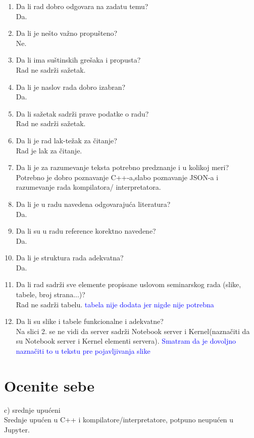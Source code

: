 \documentclass[a4paper]{report}
\newcommand{\odgovor}[1]{\textcolor{blue}{#1}}
\begin{document}
\begin{enumerate}
\item Da li rad dobro odgovara na zadatu temu?\\
Da.
\item Da li je nešto važno propušteno?\\
Ne.
\item Da li ima suštinskih grešaka i propusta?\\
Rad ne sadrži sažetak.
\item Da li je naslov rada dobro izabran?\\
Da.
\item Da li sažetak sadrži prave podatke o radu?\\
Rad ne sadrži sažetak.
\item Da li je rad lak-težak za čitanje?\\
Rad je lak za čitanje.
\item Da li je za razumevanje teksta potrebno predznanje i u kolikoj meri?\\
Potrebno je dobro poznavanje C++-a,slabo poznavanje JSON-a i razumevanje rada kompilatora/ interpretatora.
\item Da li je u radu navedena odgovarajuća literatura?\\
Da.
\item Da li su u radu reference korektno navedene?\\
Da.
\item Da li je struktura rada adekvatna?\\
Da.
\item Da li rad sadrži sve elemente propisane uslovom seminarskog rada (slike, tabele, broj strana...)?\\
Rad ne sadrži tabelu.
\odgovor{tabela nije dodata jer nigde nije potrebna}
\item Da li su slike i tabele funkcionalne i adekvatne?\\
Na slici 2. se ne vidi da server sadrži Notebook server i Kernel(naznačiti da su Notebook server i Kernel elementi servera). 
\odgovor{Smatram da je dovoljno naznačiti to u tekstu pre pojavljivanja slike}
\end{enumerate}

\section{Ocenite sebe}
c) srednje upućeni \\
Srednje upućen u C++ i kompilatore/interpretatore, potpuno neupućen u Jupyter.
\end{document}
